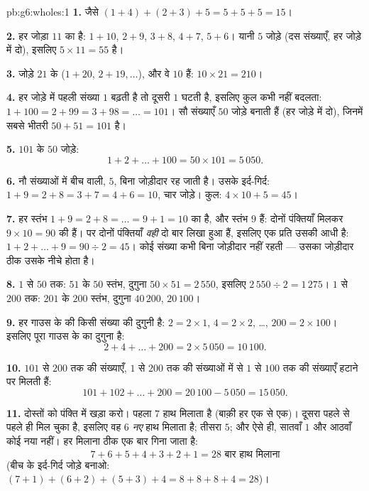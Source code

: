 \begin{solution}{pb:g6:wholes:1}
\textbf{1.} जैसे $(1 + 4) + (2 + 3) + 5 = 5 + 5 + 5 =
15$।

\textbf{2.} हर जोड़ा $11$ का है: $1 + 10$, $2 + 9$, $3 + 8$,
$4 + 7$, $5 + 6$। यानी $5$ जोड़े (दस संख्याएँ, हर जोड़े में दो),
इसलिए  $5 \times 11 = 55$ है।

\textbf{3.} जोड़े $21$ के ($1 + 20$, $2 + 19, \dots$), और वे
$10$ हैं: $10 \times 21 = 210$।

\textbf{4.} हर जोड़े में पहली संख्या $1$ बढ़ती है तो दूसरी $1$
घटती है, इसलिए कुल कभी नहीं बदलता:
$1 + 100 = 2 + 99 = 3 + 98 = \dots = 101$। सौ संख्याएँ
$50$ जोड़े बनाती हैं (हर जोड़े में दो), जिनमें सबसे भीतरी
$50 + 51 = 101$ है।

\textbf{5.} $101$ के $50$ जोड़े:
\[
1 + 2 + \dots + 100 = 50 \times 101 = 5\,050 .
\]

\textbf{6.} नौ संख्याओं में बीच वाली, $5$, बिना जोड़ीदार रह
जाती है। उसके इर्द-गिर्द: $1 + 9 = 2 + 8 = 3 + 7 = 4 + 6 = 10$,
चार जोड़े। कुल: $4 \times 10 + 5 = 45$।

\textbf{7.} हर स्तंभ $1 + 9 = 2 + 8 = \dots =
9 + 1 = 10$ का है, और स्तंभ $9$ हैं: दोनों पंक्तियाँ मिलकर
$9 \times 10 = 90$ की हैं। पर दोनों पंक्तियाँ \emph{वही} 
दो बार लिखा हुआ हैं, इसलिए एक प्रति उसकी आधी है:
$1 + 2 + \dots + 9 = 90 \div 2 = 45$। कोई संख्या कभी बिना
जोड़ीदार नहीं रहती --- उसका जोड़ीदार ठीक उसके नीचे होता है।

\textbf{8.} $1$ से $50$ तक: $51$ के $50$ स्तंभ, दुगुना 
$50 \times 51 = 2\,550$, इसलिए  $2\,550 \div 2 = 1\,275$।
$1$ से $200$ तक: $201$ के $200$ स्तंभ, दुगुना 
$40\,200$,  $20\,100$।

\textbf{9.} हर  गाउस के  की किसी संख्या की दुगुनी
है: $2 = 2 \times 1$, $4 = 2 \times 2$, \dots,
$200 = 2 \times 100$। इसलिए पूरा  गाउस के  का दुगुना है:
\[
2 + 4 + \dots + 200 = 2 \times 5\,050 = 10\,100 .
\]

\textbf{10.} $101$ से $200$ तक की संख्याएँ, $1$ से $200$ तक की
संख्याओं में से $1$ से $100$ तक की संख्याएँ हटाने पर मिलती हैं:
\[
101 + 102 + \dots + 200 = 20\,100 - 5\,050 = 15\,050 .
\]

\textbf{11.} दोस्तों को पंक्ति में खड़ा करो। पहला $7$ हाथ
मिलाता है (बाक़ी हर एक से एक)। दूसरा पहले से पहले ही मिल चुका
है, इसलिए वह $6$ \emph{नए} हाथ मिलाता है; तीसरा $5$; और ऐसे ही,
सातवाँ $1$ और आठवाँ कोई नया नहीं।
हर मिलाना ठीक एक बार गिना जाता है:
\[
7 + 6 + 5 + 4 + 3 + 2 + 1 = 28 \text{ बार हाथ मिलाना}
\]
(बीच के इर्द-गिर्द जोड़े बनाओ: $(7+1) + (6+2) + (5+3) + 4 =
8 + 8 + 8 + 4 = 28$)।


\end{solution}
